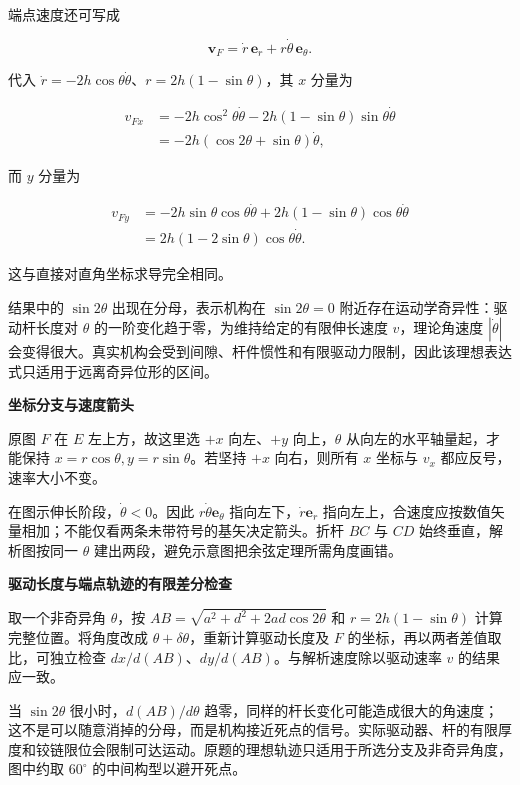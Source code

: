 \documentclass[12pt,a4paper,UTF8]{ctexart}
\begin{document}
端点速度还可写成

\[
\bm v_F=\dot r\,\bm e_r+r\dot\theta\,\bm e_\theta.
\]

代入 \(\dot r=-2h\cos\theta\dot\theta\)、\(r=2h(1-\sin\theta)\)，其
\(x\) 分量为

\[
\begin{aligned}
v_{Fx}
&=-2h\cos^2\theta\dot\theta
-2h(1-\sin\theta)\sin\theta\dot\theta\\
&=-2h(\cos2\theta+\sin\theta)\dot\theta,
\end{aligned}
\]

而 \(y\) 分量为

\[
\begin{aligned}
v_{Fy}
&=-2h\sin\theta\cos\theta\dot\theta
+2h(1-\sin\theta)\cos\theta\dot\theta\\
&=2h(1-2\sin\theta)\cos\theta\dot\theta.
\end{aligned}
\]

这与直接对直角坐标求导完全相同。

结果中的 \(\sin2\theta\) 出现在分母，表示机构在 \(\sin2\theta=0\)
附近存在运动学奇异性：驱动杆长度对 \(\theta\)
的一阶变化趋于零，为维持给定的有限伸长速度 \(v\)，理论角速度
\(|\dot\theta|\)
会变得很大。真实机构会受到间隙、杆件惯性和有限驱动力限制，因此该理想表达式只适用于远离奇异位形的区间。

\textbf{坐标分支与速度箭头}

原图 \(F\) 在 \(E\) 左上方，故这里选 \(+x\) 向左、\(+y\)
向上，\(\theta\) 从向左的水平轴量起，才能保持
\(x=r\cos\theta,y=r\sin\theta\)。若坚持 \(+x\) 向右，则所有 \(x\) 坐标与
\(v_x\) 都应反号，速率大小不变。

在图示伸长阶段，\(\dot\theta<0\)。因此 \(r\dot\theta\bm e_\theta\)
指向左下，\(\dot r\bm e_r\)
指向左上，合速度应按数值矢量相加；不能仅看两条未带符号的基矢决定箭头。折杆
\(BC\) 与 \(CD\) 始终垂直，解析图按同一 \(\theta\)
建出两段，避免示意图把余弦定理所需角度画错。

\textbf{驱动长度与端点轨迹的有限差分检查}

取一个非奇异角 \(\theta\)，按 \(AB=\sqrt{a^2+d^2+2ad\cos2\theta}\) 和
\(r=2h(1-\sin\theta)\) 计算完整位置。将角度改成
\(\theta+\delta\theta\)，重新计算驱动长度及 \(F\)
的坐标，再以两者差值取比，可独立检查
\(dx/d(AB)\)、\(dy/d(AB)\)。与解析速度除以驱动速率 \(v\) 的结果应一致。

当 \(\sin2\theta\) 很小时，\(d(AB)/d\theta\)
趋零，同样的杆长变化可能造成很大的角速度；这不是可以随意消掉的分母，而是机构接近死点的信号。实际驱动器、杆的有限厚度和铰链限位会限制可达运动。原题的理想轨迹只适用于所选分支及非奇异角度，图中约取
\(60^\circ\) 的中间构型以避开死点。
\end{document}
